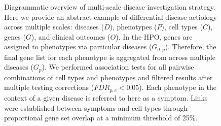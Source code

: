 \documentclass[
sn-nature
]{sn-jnl}
\begin{document}
\begin{figure}


\caption{\label{fig-diagram}Diagrammatic overview of multi-scale disease
investigation strategy. Here we provide an abstract example of
differential disease aetiology across multiple scales: diseases (\(D\)),
phenotypes (\(P\)), cell types (\(C\)), genes (\(G\)), and clinical
outcomes (\(O\)). In the HPO, genes are assigned to phenotypes via
particular diseases (\(G_{d,p}\)). Therefore, the final gene list for
each phenotype is aggregated from across multiple diseases (\(G_{p}\)).
We performed association tests for all pairwise combinations of cell
types and phenotypes and filtered results after multiple testing
corrections (\(FDR_{p,c}<0.05\)). Each phenotype in the context of a
given disease is referred to here as a symptom. Links were established
between symptoms and cell types through proportional gene set overlap at
a minimum threshold of 25\%.}

\end{figure}%
\end{document}
